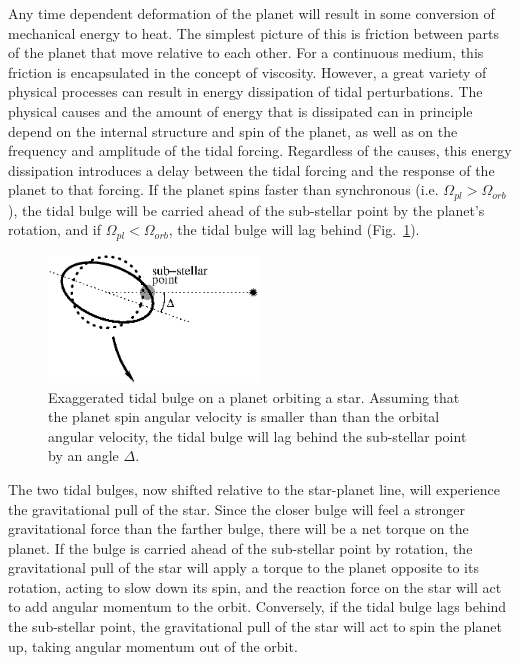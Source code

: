 Any time dependent deformation of the planet will result in some conversion of
mechanical energy to heat. The simplest picture of this is friction between
parts of the planet that move relative to each other. For a continuous medium,
this friction is encapsulated in the concept of viscosity. However, a great
variety of physical processes can result in energy dissipation of tidal
perturbations. The physical causes and the amount of energy that is dissipated
can in principle depend on the internal structure and spin of the planet, as
well as on the frequency and amplitude of the tidal forcing. Regardless of the
causes, this energy dissipation introduces a delay between the tidal forcing and
the response of the planet to that forcing. If the planet spins faster than
synchronous (i.e.  $\Omega_{pl} > \Omega_{orb}$), the tidal bulge will be
carried ahead of the sub-stellar point by the planet's rotation, and if
$\Omega_{pl} < \Omega_{orb}$, the tidal bulge will lag behind
(Fig.~\ref{fig:tidal_bulge}).

\begin{figure}[t]
%
    \centering
%
    \includegraphics[width=0.5\textwidth]{tidal_bulge.eps}
%
    \caption{
%
        Exaggerated tidal bulge on a planet orbiting a star. Assuming that the
        planet spin angular velocity is smaller than than the orbital angular
        velocity, the tidal bulge will lag behind the sub-stellar point by an
        angle $\Delta$.
%
    }
%
    \label{fig:tidal_bulge}
%
\end{figure}

The two tidal bulges, now shifted relative to the star-planet line, will
experience the gravitational pull of the star. Since the closer bulge will feel
a stronger gravitational force than the farther bulge, there will be a net
torque on the planet. If the bulge is carried ahead of the sub-stellar point by
rotation, the gravitational pull of the star will apply a torque to the planet
opposite to its rotation, acting to slow down its spin, and the reaction force
on the star will act to add angular momentum to the orbit. Conversely, if the
tidal bulge lags behind the sub-stellar point, the gravitational pull of the
star will act to spin the planet up, taking angular momentum out of the orbit.

